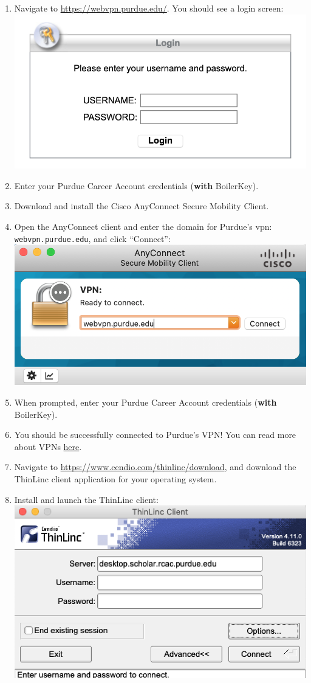 \documentclass[
]{book}
\providecommand{\tightlist}{%
  \setlength{\itemsep}{0pt}\setlength{\parskip}{0pt}}
\begin{document}
\begin{enumerate}
\def\labelenumi{\arabic{enumi}.}
\tightlist
\item
  Navigate to \url{https://webvpn.purdue.edu/}. You should see a login screen:
  \includegraphics{images/login.png}
\item
  Enter your Purdue Career Account credentials (\textbf{with} BoilerKey).
\item
  Download and install the Cisco AnyConnect Secure Mobility Client.
\item
  Open the AnyConnect client and enter the domain for Purdue's vpn: \texttt{webvpn.purdue.edu}, and click ``Connect'':
  \includegraphics{images/anyconnect.png}
\item
  When prompted, enter your Purdue Career Account credentials (\textbf{with} BoilerKey).
\item
  You should be successfully connected to Purdue's VPN! You can read more about VPNs \protect\hyperlink{vpns}{here}.
\item
  Navigate to \url{https://www.cendio.com/thinlinc/download}, and download the ThinLinc client application for your operating system.
\item
  Install and launch the ThinLinc client:
  \includegraphics{images/thinlincclient.png}

\end{enumerate}
\end{document}
